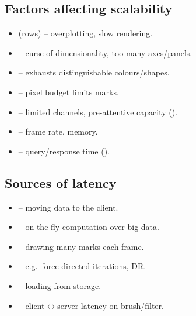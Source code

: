 \subsection{Factors affecting scalability}
\begin{itemize}[leftmargin=1.4em]
  \item {} (rows) -- overplotting, slow rendering.
  \item {} -- curse of dimensionality,
        too many axes/panels.
  \item {} -- exhausts distinguishable colours/shapes.
  \item {} -- pixel budget limits marks.
  \item {} -- limited channels, pre-attentive capacity
        ().
  \item {} -- frame rate, memory.
  \item {} -- query/response time
        ().
\end{itemize}

\subsection{Sources of latency}
\begin{itemize}[leftmargin=1.4em]
  \item {} -- moving data to the client.
  \item {} -- on-the-fly computation over big data.
  \item {} -- drawing many marks each frame.
  \item {} -- e.g.\ force-directed iterations, DR.
  \item {} -- loading from storage.
  \item {} -- client$\leftrightarrow$server latency
        on brush/filter.
\end{itemize}

